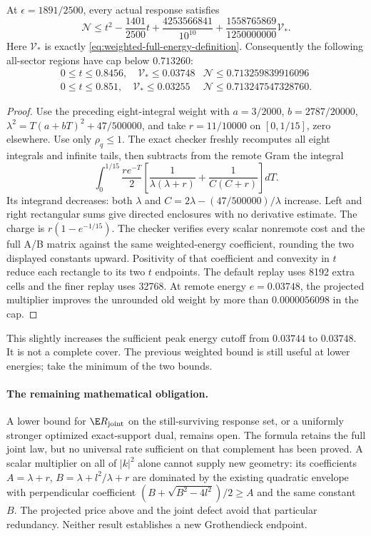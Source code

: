 \begin{theorem}
At $\epsilon=1891/2500$, every actual response satisfies
\begin{equation}\label{eq:projected-price-cap}
 \mathcal N\le t^2-\frac{1401}{2500}t
 +\frac{4253566841}{10^{10}}
 +\frac{1558765869}{1250000000}\mathcal V_*.
\end{equation}
Here $\mathcal V_*$ is exactly \eqref{eq:weighted-full-energy-definition}.
Consequently the following all-sector regions have cap below $0.713260$:
\[
 \begin{array}{c|c}
 0\le t\le0.8456,\quad\mathcal V_*\le0.03748
     &\mathcal N\le0.713259839916096\\
 0\le t\le0.851,\quad\mathcal V_*\le0.03255
     &\mathcal N\le0.713247547328760.
 \end{array}
\]
\end{theorem}
\begin{proof}
Use the preceding eight-integral weight with
$a=3/2000$, $b=2787/20000$,
$\lambda^2=T(a+bT)^2+47/500000$, and take
$r=11/10000$ on $[0,1/15]$, zero elsewhere. Use only $\rho_q\le1$.
The exact checker freshly recomputes all eight integrals and infinite
tails, then subtracts from the remote Gram the integral
\[
 \int_0^{1/15}\frac{r e^{-T}}2
 \left[\frac1{\lambda(\lambda+r)}+
 \frac1{C(C+r)}\right]dT.
\]
Its integrand decreases: both $\lambda$ and
$C=2\lambda-(47/500000)/\lambda$ increase.
Left and right rectangular sums give directed enclosures with no
derivative estimate. The charge is $r(1-e^{-1/15})$.
The checker verifies every scalar nonremote cost and the full A/B matrix
against the same weighted-energy coefficient, rounding the two displayed
constants upward. Positivity of that coefficient and convexity in $t$
reduce each rectangle to its two $t$ endpoints.
The default replay uses 8192 extra cells and the finer replay uses 32768.
At remote energy $e=0.03748$, the projected multiplier improves the
unrounded old weight by more than $0.0000056098$ in the cap.
\end{proof}
This slightly increases the sufficient peak energy cutoff from $0.03744$
to $0.03748$. It is not a complete cover. The previous weighted bound
is still useful at lower energies; take the minimum of the two bounds.

\paragraph{The remaining mathematical obligation.}
A lower bound for $\E R_{\rm joint}$ on the still-surviving response
set, or a uniformly stronger optimized exact-support dual, remains open.
The formula retains the full joint law, but no universal rate sufficient
on that complement has been proved. A scalar multiplier on all of
$|k|^2$ alone cannot supply new geometry: its coefficients
$A=\lambda+r$, $B=\lambda+l^2/\lambda+r$ are dominated by the
existing quadratic envelope with perpendicular coefficient
$(B+\sqrt{B^2-4l^2})/2\ge A$ and the same constant $B$.
The projected price above and the joint defect avoid that particular
redundancy. Neither result establishes a new Grothendieck endpoint.


